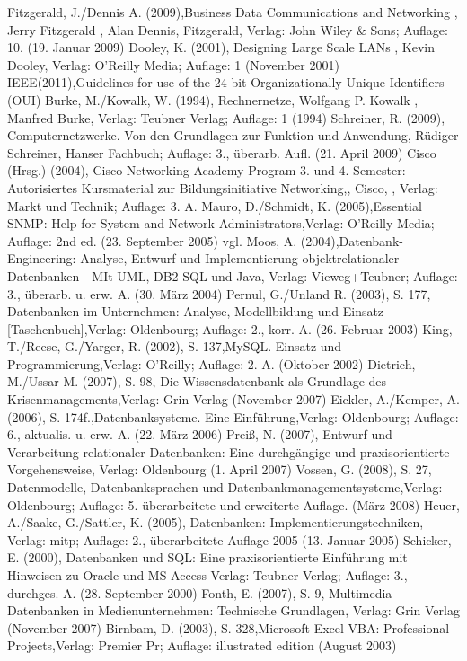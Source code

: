 Fitzgerald, J./Dennis A. (2009),Business Data Communications and Networking , Jerry Fitzgerald , Alan Dennis, Fitzgerald, Verlag: John Wiley \& Sons; Auflage: 10. (19. Januar 2009)
Dooley, K. (2001), Designing Large Scale LANs , Kevin Dooley, Verlag: O'Reilly Media; Auflage: 1 (November 2001)
IEEE(2011),Guidelines for use of the 24-bit Organizationally Unique Identifiers (OUI)
Burke, M./Kowalk, W. (1994), Rechnernetze, Wolfgang P. Kowalk , Manfred Burke, Verlag: Teubner Verlag; Auflage: 1 (1994)
Schreiner, R. (2009), Computernetzwerke. Von den Grundlagen zur Funktion und Anwendung, Rüdiger Schreiner, Hanser Fachbuch; Auflage: 3., überarb. Aufl. (21. April 2009)
Cisco (Hrsg.) (2004), Cisco Networking Academy Program 3. und 4. Semester: Autorisiertes Kursmaterial zur Bildungsinitiative Networking,, Cisco, , Verlag: Markt und Technik; Auflage: 3. A. 
Mauro, D./Schmidt, K. (2005),Essential SNMP: Help for System and Network Administrators,Verlag: O'Reilly Media; Auflage: 2nd ed. (23. September 2005)
vgl. Moos, A. (2004),Datenbank-Engineering: Analyse, Entwurf und Implementierung objektrelationaler Datenbanken - MIt UML, DB2-SQL und Java, Verlag: Vieweg+Teubner; Auflage: 3., überarb. u. erw. A. (30. März 2004)
Pernul, G./Unland R. (2003), S. 177, Datenbanken im Unternehmen: Analyse, Modellbildung und Einsatz [Taschenbuch],Verlag: Oldenbourg; Auflage: 2., korr. A. (26. Februar 2003)
King, T./Reese, G./Yarger, R. (2002), S. 137,MySQL. Einsatz und Programmierung,Verlag: O'Reilly; Auflage: 2. A. (Oktober 2002)
Dietrich, M./Ussar M. (2007), S. 98, Die Wissensdatenbank als Grundlage des Krisenmanagements,Verlag: Grin Verlag (November 2007)
Eickler, A./Kemper, A. (2006), S. 174f.,Datenbanksysteme. Eine Einführung,Verlag: Oldenbourg; Auflage: 6., aktualis. u. erw. A. (22. März 2006)
Preiß, N. (2007), Entwurf und Verarbeitung relationaler Datenbanken: Eine durchgängige und praxisorientierte Vorgehensweise, Verlag: Oldenbourg (1. April 2007)
Vossen, G. (2008), S. 27, Datenmodelle, Datenbanksprachen und Datenbankmanagementsysteme,Verlag: Oldenbourg; Auflage: 5. überarbeitete und erweiterte Auflage. (März 2008)
Heuer, A./Saake, G./Sattler, K. (2005), Datenbanken: Implementierungstechniken, Verlag: mitp; Auflage: 2., überarbeitete Auflage 2005 (13. Januar 2005)
Schicker, E. (2000), Datenbanken und SQL: Eine praxisorientierte Einführung mit Hinweisen zu Oracle und MS-Access Verlag: Teubner Verlag; Auflage: 3., durchges. A. (28. September 2000)
Fonth, E. (2007), S. 9, Multimedia-Datenbanken in Medienunternehmen: Technische Grundlagen, Verlag: Grin Verlag (November 2007)
Birnbam, D. (2003), S. 328,Microsoft Excel VBA: Professional Projects,Verlag: Premier Pr; Auflage: illustrated edition (August 2003)
